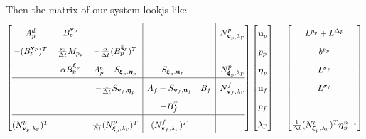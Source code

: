 \documentclass{article}
\newcommand{\mathspace}[1]{\ensuremath{#1}\xspace} %
\newcommand{\dt}{\mathspace{\Delta t}}
\newcommand{\matzero}{}        %
\newcommand{\uf}{\mathspace{\mathbf{u}_f}}
\newcommand{\vf}{\mathspace{\mathbf{v}_f}}
\newcommand{\up}{\mathspace{\mathbf{u}_p}}
\newcommand{\vp}{\mathspace{\mathbf{v}_p}}
\newcommand{\pf}{\mathspace{p_f}}
\newcommand{\pp}{\mathspace{p_p}}
\newcommand{\wf}{\mathspace{w_f}}
\renewcommand{\wp}{\mathspace{w_p}}
\newcommand{\disp}{\mathspace{\boldsymbol{\eta}_p}}
\newcommand{\disptest}{\mathspace{\boldsymbol{\xi}_p}}
\newcommand{\mult}{\mathspace{\lambda_{\Gamma}}}
\newcommand{\multtest}{\mathspace{\mu_{\Gamma}}}
\begin{document}
Then the matrix of our system lookjs like
\[ \renewcommand{\arraystretch}{1.8}
  \left[\begin{array}{@{}ccc|cc|c@{}}
          
          A^d_p & B^{\vp}_p & \matzero & \matzero & \matzero & N^p_{\vp, \mult} \\ %
          - (B^{\vp}_p)^T & \frac {s_0}{\dt} M_{\pp} & - \frac{\alpha}{\dt} (B^{\disptest}_p)^T & \matzero & \matzero & \matzero\\ %
          \matzero & \alpha B^{\disptest}_p & A^e_p + S_{\disptest, \disp} & - S_{\disptest, \uf} & \matzero & N^p_{\disptest, \mult}\\ %
          \hline
          \matzero & \matzero & - \frac 1 {\dt} S_{\vf, \disp} & A_f + S_{\vf, \uf} & B_f & N^f_{\vf, \mult}\\ %
          \matzero & \matzero & \matzero & -B_f^T & \matzero & \matzero \\ %
          \hline
          (N^p_{\vp, \mult})^T & \matzero & \frac 1 {\dt} (N^p_{\disptest, \mult})^T & (N^f_{\vf, \mult})^T & \matzero & \matzero \\ %

        \end{array}\right]
      \left[\begin{array}{@{}c@{}}
                \up \\
                \pp \\
                \disp \\
                \uf \\
                \pf \\
                \mult
            \end{array}\right]
          = \newline
                      \left[\begin{array}{@{}c@{}}
                L^{\pp} + L^{\Delta p} \\
                              b^{\pp} \\
                L^{\sigma_p} \\
                L^{\sigma_f} \\
                \matzero \\
                \frac 1 {\dt} (N^p_{\disptest, \mult})^T \disp^{n-1} \\
        \end{array}\right]
    \]
\end{document}
